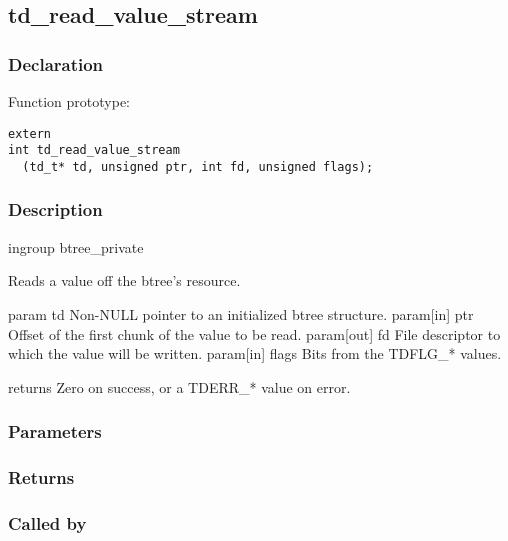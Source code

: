 
\newpage
\subsection{td\_read\_value\_stream}
\subsubsection{Declaration} Function prototype:

\begin{verbatim}
extern
int td_read_value_stream
  (td_t* td, unsigned ptr, int fd, unsigned flags);
\end{verbatim}

\subsubsection{Description}


 ingroup btree\_private

 Reads a value off the btree's resource.

 param td Non-NULL pointer to an initialized btree structure.
 param[in] ptr Offset of the first chunk of the value to be read.
 param[out] fd File descriptor to which the value will be written.
 param[in] flags Bits from the TDFLG\_* values.

 returns Zero on success, or a TDERR\_* value on error.
 

\subsubsection{Parameters}
\subsubsection{Returns}
\subsubsection{Called by}
